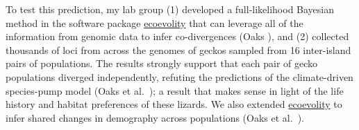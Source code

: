 %
To test this prediction, my lab group
(1) developed a full-likelihood Bayesian method in the software package
\href{http://phyletica.org/ecoevolity/}{ecoevolity}
that can leverage all of the information from genomic data to infer
co-divergences
(Oaks \citeyear{Oaks2018ecoevolity}),
and
(2) collected thousands of loci from across the genomes of geckos sampled from
16 inter-island pairs of populations.
The results strongly support that each pair of gecko populations diverged
independently, refuting the predictions of the climate-driven species-pump
model
(Oaks et al.\ \citeyear{Oaks2018paic});
a result that makes sense in light of the life history and habitat
preferences of these lizards.
%
We also extended
\href{http://phyletica.org/ecoevolity/}{ecoevolity}
to infer shared changes in demography across populations
(Oaks et al.\ \citeyear{Oaks2019codemog}).



